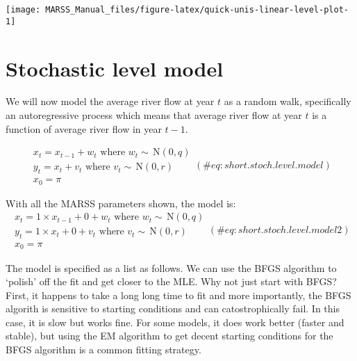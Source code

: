 \documentclass[12pt,]{book}
\begin{document}
\begin{center}\texttt{[image: MARSS\_Manual\_files/figure-latex/quick-unis-linear-level-plot-1]} \end{center}

\hypertarget{stochastic-level-model}{%
\section{Stochastic level model}\label{stochastic-level-model}}

We will now model the average river flow at year \(t\) as a random walk, specifically an autoregressive process which means that average river flow at year \(t\) is a function of average river flow in year \(t-1\).

\begin{equation}
\begin{gathered}
x_t = x_{t-1}+w_t \text{ where } w_t \sim \,\text{N}(0,q) \\
y_t = x_t+v_t \text{ where } v_t \sim \,\text{N}(0,r)  \\
x_0 = \pi 
\end{gathered}   
(\#eq:short.stoch.level.model)
\end{equation}

With all the MARSS parameters shown, the model is:
\begin{equation}
\begin{gathered}
x_t = 1 \times x_{t-1}+ 0 + w_t    \text{ where } w_t \sim \,\text{N}(0,q) \\
y_t = 1 \times x_t + 0 + v_t \text{ where } v_t \sim \,\text{N}(0,r)  \\
x_0 = \pi 
 \end{gathered}   
(\#eq:short.stoch.level.model2)
\end{equation}

The model is specified as a list as follows. We can use the BFGS algorithm to `polish' off the fit and get closer to the MLE. Why not just start with BFGS? First, it happens to take a long long time to fit and more importantly, the BFGS algorith is sensitive to starting conditions and can catostrophically fail. In this case, it is slow but works fine. For some models, it does work better (faster and stable), but using the EM algorithm to get decent starting conditions for the BFGS algorithm is a common fitting strategy.
\end{document}
